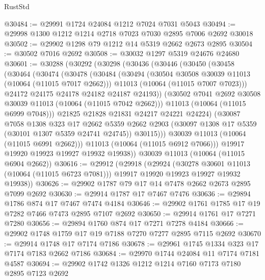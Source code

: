 \begin{lexlean}{RustStd}
\begin{coremodule}
@30484 := @29991 @1724 @24084 @1212 @7024 @7031 @5043
@30494 := @29998 @1300 @1212 @1214 @2718 @7023 @7030 @2895 @7006 @2692 @30018
@30502 := @29902 @1298 @79 @1212 @14 @5319 @2662 @2673 @2895
@30504 := @30502 @7016 @2692
@30508 := @30032 @1297 @5319 @24676 @24680
@30601 := @30288
    (@30292
      (@30298
        (@30436
          (@30446
            (@30450
              (@30458
                (@30464
                  (@30474
                    (@30478
                      (@30484
                        (@30494
                          (@30504 @30508 @30039 @11013 (@10064 (@11015 @7017 @2662)))
                          @11013
                          (@10064 (@11015 @7007 @7023)))
                        @24172
                        @24175
                        @24178
                        @24182
                        @24187
                        @24193))
                    (@30502 @7041 @2692 @30508 @30039 @11013 (@10064 (@11015 @7042 @2662)))
                    @11013
                    (@10064 (@11015 @6999 @7048)))
                  @21825
                  @21828
                  @21831
                  @24217
                  @24221
                  @24224)
                (@30087
                  @7058
                  @1308
                  @323
                  @17
                  @2662
                  @5359
                  @2662
                  @2903
                  (@30097 @1308 @17 @5359 (@30101 @1307 @5359 @24741 @24745))
                  @30115)))
            @30039
            @11013
            (@10064 (@11015 @6991 @2662)))
          @11013
          (@10064 (@11015 @6912 @7066)))
        @19917
        @19920
        @19923
        @19927
        @19932
        @19938))
    @30039
    @11013
    (@10064 (@11015 @6904 @2662))
@30616 := @29912
    (@29918
      (@29924
        (@30278 @30601 @11013 (@10064 (@11015 @6723 @7081)))
        @19917
        @19920
        @19923
        @19927
        @19932
        @19938))
@30626 := @29902 @1787 @79 @17 @14 @7478 @2662 @2673 @2895 @7099 @2692
@30630 := @29914 @1787 @17 @7467 @7476
@30636 := @29894 @1786 @874 @17 @7467 @7474 @4184
@30646 := @29902 @1761 @1785 @17 @19 @7282 @7466 @7473 @2895 @7107 @2692
@30650 := @29914 @1761 @17 @7271 @7280
@30656 := @29894 @1760 @874 @17 @7271 @7278 @4184
@30666 := @29902 @1748 @1759 @17 @19 @7188 @7270 @7277 @2895 @7115 @2692
@30670 := @29914 @1748 @17 @7174 @7186
@30678 := @29961 @1745 @1334 @323 @17 @7174 @7183 @2662 @7186
@30684 := @29970 @1744 @24084 @11 @7174 @7181 @4587
@30694 := @29902 @1742 @1326 @1212 @1214 @7160 @7173 @7180 @2895 @7123 @2692

\end{coremodule}
\end{lexlean}
